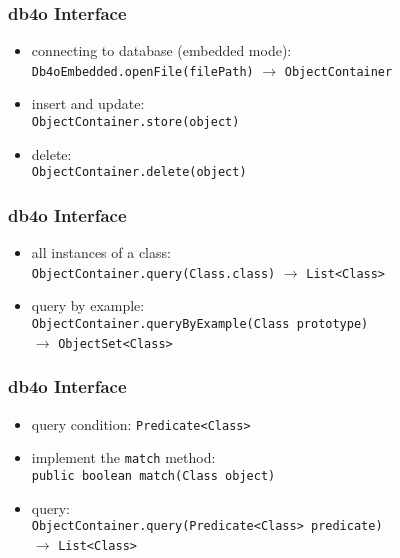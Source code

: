 \documentclass[dvipsnames]{beamer}
\theoremstyle{plain}
\begin{document}
\begin{frame}
  \frametitle{db4o Interface}

  \begin{itemize}
    \item connecting to database (embedded mode):\\
      \lstinline!Db4oEmbedded.openFile(filePath)!
        $\rightarrow$ \lstinline!ObjectContainer!

    \pause
    \medskip
    \item insert and update:\\
      \lstinline!ObjectContainer.store(object)!
    \item delete:\\
      \lstinline!ObjectContainer.delete(object)!
  \end{itemize}
\end{frame}

\begin{frame}
  \frametitle{db4o Interface}

  \begin{itemize}
    \item all instances of a class:\\
      \lstinline!ObjectContainer.query(Class.class)!
       $\rightarrow$ \lstinline!List<Class>!

    \pause
    \medskip
    \item query by example:\\
      \lstinline!ObjectContainer.queryByExample(Class prototype)!\\
       $\rightarrow$ \lstinline!ObjectSet<Class>!
  \end{itemize}
\end{frame}

\begin{frame}
  \frametitle{db4o Interface}

  \begin{itemize}
    \item query condition: \lstinline!Predicate<Class>!
    \item implement the \lstinline!match! method:\\
      \lstinline!public boolean match(Class object)!

    \pause
    \medskip
    \item query:\\
      \lstinline!ObjectContainer.query(Predicate<Class> predicate)!\\
      $\rightarrow$ \lstinline!List<Class>!
  \end{itemize}
\end{frame}
\end{document}
